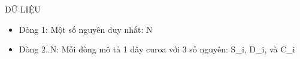 DỮ LIỆU
\begin{itemize}
	\item     Dòng 1: Một số nguyên duy nhất: N   
	\item     Dòng 2..N: Mỗi dòng mô tả 1 dây curoa với 3 số nguyên: S\_i, D\_i, và C\_i   
\end{itemize}